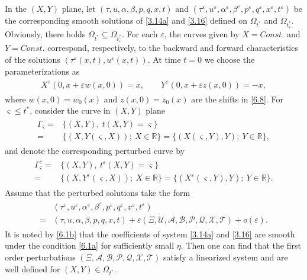 \documentclass[11pt,reqno]{article}
\newcommand{\eps}{\varepsilon}
\numberwithin{equation}{section}
\begin{document}
In the $(X,Y)$ plane, let $(\tau, u, \alpha, \beta, p, q, x, t)$ and $(\tau^\eps, u^\eps, \alpha^\eps, \beta^\eps, p^\eps, q^\eps, x^\eps, t^\eps)$ be the corresponding smooth solutions of \eqref{3.14a} and \eqref{3.16} defined on $\Omega_{t^*}$ and $\Omega_{t_{\eps}^*}$. Obviously, there holds $\Omega_{t^*}\subseteq \Omega_{t_{\eps}^*}$. For each $\eps$, the curves given by $X=Const.$ and $Y=Const.$ correspond, respectively, to the backward and forward characteristics of the solutions $(\tau^\eps(x,t), u^\eps(x,t))$. At time
$t=0$ we choose the parameterizations as
\begin{align}\label{7.1}
\begin{split}
X^\eps(0, x+\eps w(x,0))=x,\qquad Y^\eps(0, x+\eps z(x,0))=-x,
\end{split}
\end{align}
where $w(x,0)=w_0(x)$ and $z(x,0)=z_0(x)$ are the shifts in \eqref{6.8}. For $\varsigma\leq t^*$, consider the curve in $(X,Y)$ plane
\begin{align}\label{7.2}
\begin{split}
\Gamma_{\varsigma} =&\{(X,Y),\ t(X,Y)=\varsigma\} \\
=& \{(X, Y(\varsigma, X));\ X\in \mathbb{R}\} =\{(X(\varsigma, Y), Y);\ Y\in \mathbb{R}\},
\end{split}
\end{align}
and denote the corresponding perturbed curve by
\begin{align}\label{7.3}
\begin{split}
\Gamma_{\varsigma}^\eps =&\{(X,Y),\ t^\eps (X,Y)=\varsigma\} \\
=& \{(X, Y^\eps(\varsigma, X));\ X\in \mathbb{R}\} =\{(X^\eps(\varsigma, Y), Y);\ Y\in \mathbb{R}\}.
\end{split}
\end{align}
Assume that the perturbed solutions take the form
\begin{align}\label{7.4}
\begin{split}
&(\tau^\eps, u^\eps, \alpha^\eps, \beta^\eps, p^\eps, q^\eps, x^\eps, t^\eps)\\
=& (\tau, u, \alpha, \beta, p, q, x, t)+\eps (\Xi, \mathcal{U}, \mathcal{A}, \mathcal{B}, \mathcal{P}, \mathcal{Q}, \mathcal{X}, \mathcal{T}) +o(\eps).
\end{split}
\end{align}
It is noted by \eqref{6.1b} that the coefficients of system \eqref{3.14a} and \eqref{3.16} are smooth under the condition \eqref{6.1a} for sufficiently small $\eta$. Then one can find that the first
order perturbations $(\Xi, \mathcal{A}, \mathcal{B}, \mathcal{P}, \mathcal{Q}, \mathcal{X}, \mathcal{T})$ satisfy a linearized system and are well defined for $(X,Y)\in \Omega_{t^*}$.
\end{document}
